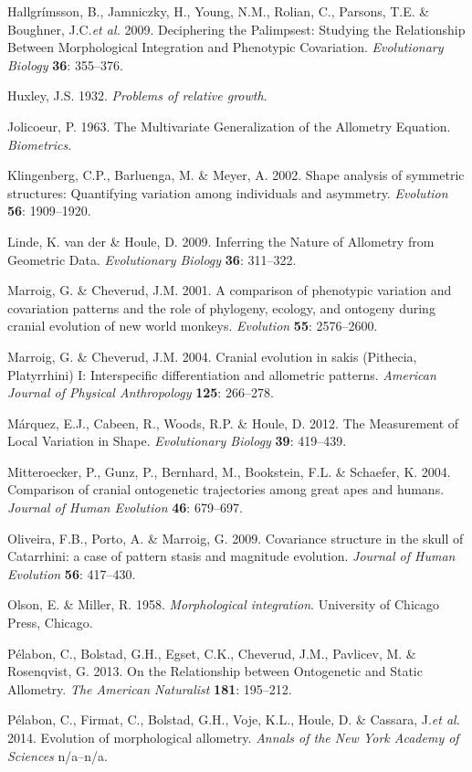\documentclass[12pt,]{article}
\begin{document}
Hallgrímsson, B., Jamniczky, H., Young, N.M., Rolian, C., Parsons, T.E.
\& Boughner, J.C.\emph{et al.} 2009. Deciphering the Palimpsest:
Studying the Relationship Between Morphological Integration and
Phenotypic Covariation. \emph{Evolutionary Biology} \textbf{36}:
355--376.

Huxley, J.S. 1932. \emph{Problems of relative growth}.

Jolicoeur, P. 1963. The Multivariate Generalization of the Allometry
Equation. \emph{Biometrics}.

Klingenberg, C.P., Barluenga, M. \& Meyer, A. 2002. Shape analysis of
symmetric structures: Quantifying variation among individuals and
asymmetry. \emph{Evolution} \textbf{56}: 1909--1920.

Linde, K. van der \& Houle, D. 2009. Inferring the Nature of Allometry
from Geometric Data. \emph{Evolutionary Biology} \textbf{36}: 311--322.

Marroig, G. \& Cheverud, J.M. 2001. A comparison of phenotypic variation
and covariation patterns and the role of phylogeny, ecology, and
ontogeny during cranial evolution of new world monkeys. \emph{Evolution}
\textbf{55}: 2576--2600.

Marroig, G. \& Cheverud, J.M. 2004. Cranial evolution in sakis
(Pithecia, Platyrrhini) I: Interspecific differentiation and allometric
patterns. \emph{American Journal of Physical Anthropology} \textbf{125}:
266--278.

Márquez, E.J., Cabeen, R., Woods, R.P. \& Houle, D. 2012. The
Measurement of Local Variation in Shape. \emph{Evolutionary Biology}
\textbf{39}: 419--439.

Mitteroecker, P., Gunz, P., Bernhard, M., Bookstein, F.L. \& Schaefer,
K. 2004. Comparison of cranial ontogenetic trajectories among great apes
and humans. \emph{Journal of Human Evolution} \textbf{46}: 679--697.

Oliveira, F.B., Porto, A. \& Marroig, G. 2009. Covariance structure in
the skull of Catarrhini: a case of pattern stasis and magnitude
evolution. \emph{Journal of Human Evolution} \textbf{56}: 417--430.

Olson, E. \& Miller, R. 1958. \emph{Morphological integration}.
University of Chicago Press, Chicago.

Pélabon, C., Bolstad, G.H., Egset, C.K., Cheverud, J.M., Pavlicev, M. \&
Rosenqvist, G. 2013. On the Relationship between Ontogenetic and Static
Allometry. \emph{The American Naturalist} \textbf{181}: 195--212.

Pélabon, C., Firmat, C., Bolstad, G.H., Voje, K.L., Houle, D. \&
Cassara, J.\emph{et al.} 2014. Evolution of morphological allometry.
\emph{Annals of the New York Academy of Sciences} n/a--n/a.
\end{document}
